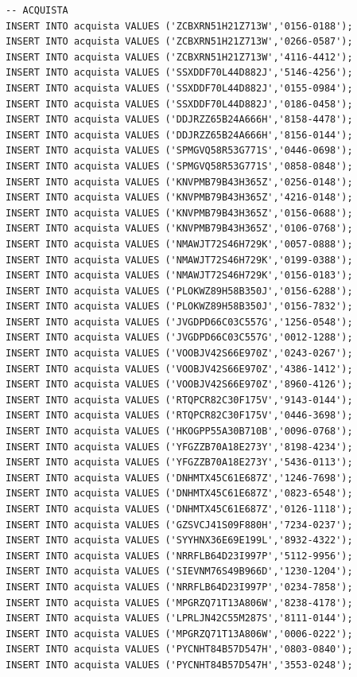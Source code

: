 \documentclass[12pt]{report}
\begin{document}
\begin{scriptsize}
\begin{verbatim}
-- ACQUISTA
INSERT INTO acquista VALUES ('ZCBXRN51H21Z713W','0156-0188');
INSERT INTO acquista VALUES ('ZCBXRN51H21Z713W','0266-0587');
INSERT INTO acquista VALUES ('ZCBXRN51H21Z713W','4116-4412');
INSERT INTO acquista VALUES ('SSXDDF70L44D882J','5146-4256');
INSERT INTO acquista VALUES ('SSXDDF70L44D882J','0155-0984');
INSERT INTO acquista VALUES ('SSXDDF70L44D882J','0186-0458');
INSERT INTO acquista VALUES ('DDJRZZ65B24A666H','8158-4478');
INSERT INTO acquista VALUES ('DDJRZZ65B24A666H','8156-0144');
INSERT INTO acquista VALUES ('SPMGVQ58R53G771S','0446-0698');
INSERT INTO acquista VALUES ('SPMGVQ58R53G771S','0858-0848');
INSERT INTO acquista VALUES ('KNVPMB79B43H365Z','0256-0148');
INSERT INTO acquista VALUES ('KNVPMB79B43H365Z','4216-0148');
INSERT INTO acquista VALUES ('KNVPMB79B43H365Z','0156-0688');
INSERT INTO acquista VALUES ('KNVPMB79B43H365Z','0106-0768');
INSERT INTO acquista VALUES ('NMAWJT72S46H729K','0057-0888');
INSERT INTO acquista VALUES ('NMAWJT72S46H729K','0199-0388');
INSERT INTO acquista VALUES ('NMAWJT72S46H729K','0156-0183');
INSERT INTO acquista VALUES ('PLOKWZ89H58B350J','0156-6288');
INSERT INTO acquista VALUES ('PLOKWZ89H58B350J','0156-7832');
INSERT INTO acquista VALUES ('JVGDPD66C03C557G','1256-0548');
INSERT INTO acquista VALUES ('JVGDPD66C03C557G','0012-1288');
INSERT INTO acquista VALUES ('VOOBJV42S66E970Z','0243-0267');
INSERT INTO acquista VALUES ('VOOBJV42S66E970Z','4386-1412');
INSERT INTO acquista VALUES ('VOOBJV42S66E970Z','8960-4126');
INSERT INTO acquista VALUES ('RTQPCR82C30F175V','9143-0144');
INSERT INTO acquista VALUES ('RTQPCR82C30F175V','0446-3698');
INSERT INTO acquista VALUES ('HKOGPP55A30B710B','0096-0768');
INSERT INTO acquista VALUES ('YFGZZB70A18E273Y','8198-4234');
INSERT INTO acquista VALUES ('YFGZZB70A18E273Y','5436-0113');
INSERT INTO acquista VALUES ('DNHMTX45C61E687Z','1246-7698');
INSERT INTO acquista VALUES ('DNHMTX45C61E687Z','0823-6548');
INSERT INTO acquista VALUES ('DNHMTX45C61E687Z','0126-1118');
INSERT INTO acquista VALUES ('GZSVCJ41S09F880H','7234-0237');
INSERT INTO acquista VALUES ('SYYHNX36E69E199L','8932-4322');
INSERT INTO acquista VALUES ('NRRFLB64D23I997P','5112-9956');
INSERT INTO acquista VALUES ('SIEVNM76S49B966D','1230-1204');
INSERT INTO acquista VALUES ('NRRFLB64D23I997P','0234-7858');
INSERT INTO acquista VALUES ('MPGRZQ71T13A806W','8238-4178');
INSERT INTO acquista VALUES ('LPRLJN42C55M287S','8111-0144');
INSERT INTO acquista VALUES ('MPGRZQ71T13A806W','0006-0222');
INSERT INTO acquista VALUES ('PYCNHT84B57D547H','0803-0840');
INSERT INTO acquista VALUES ('PYCNHT84B57D547H','3553-0248');


\end{verbatim}
\end{scriptsize}
\end{document}
